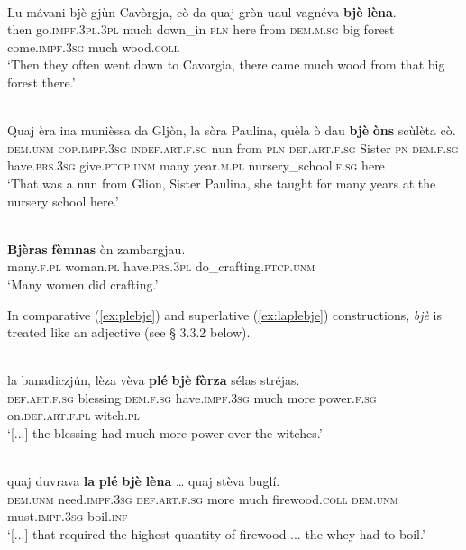 \ea

\\
\gll  Lu mávani bjè gjùn Cavòrgja, cò da quaj gròn uaul vagnéva \textbf{bjè} \textbf{lèna}.\\
then go.\textsc{impf.3pl.3pl} much down\_in \textsc{pln} here from \textsc{dem.m.sg} big forest come.\textsc{impf.3sg} much wood.\textsc{coll}  \\
\glt `Then they often went down to Cavorgia, there came much wood from that big forest there.'
\z

\ea

\\
\gll Quaj èra ina munièssa da Gljòn, la sòra Paulina, quèla ò dau \textbf{bjè} \textbf{òns} scùlèta cò.\\
\textsc{dem.unm} \textsc{cop.impf.3sg} \textsc{indef.art.f.sg} nun from \textsc{pln} \textsc{def.art.f.sg} Sister \textsc{pn} \textsc{dem.f.sg}  have.\textsc{prs.3sg} give.\textsc{ptcp.unm} many year.\textsc{m.pl} nursery\_school.\textsc{f.sg} here\\
\glt `That was a nun from Glion, Sister Paulina, she taught for many years at the nursery school here.'
\z

\ea

\\
\gll \textbf{Bjèras} \textbf{fèmnas} òn zambargjau.\\
many.\textsc{f.pl} woman.\textsc{pl} have.\textsc{prs.3pl} do\_crafting.\textsc{ptcp.unm}\\
\glt `Many women did crafting.'
\z

In comparative (\ref{ex:plebje}) and superlative (\ref{ex:laplebje}) constructions, \textit{bjè} is treated like an adjective (see § 3.3.2 below). 

\ea
\label{ex:plebje}
\\
	\gll [...] la banadiczjún, lèza vèva \textbf{plé} \textbf{bjè} \textbf{fòrza} sélas stréjas.\\
{} \textsc{def.art.f.sg} blessing \textsc{dem.f.sg} have.\textsc{impf.3sg} much more power.\textsc{f.sg} on.\textsc{def.art.f.pl} witch.\textsc{pl}\\
\glt `[...] the blessing had much more power over the witches.'
\z

\ea
\label{ex:laplebje}
\\
\gll [...] quaj duvrava \textbf{la} \textbf{plé} \textbf{bjè} \textbf{lèna} … quaj stèva buglí.  \\
{} \textsc{dem.unm} need.\textsc{impf.3sg} \textsc{def.art.f.sg} more much firewood.\textsc{coll} {} \textsc{dem.unm} must.\textsc{impf.3sg} boil.\textsc{inf}\\
\glt `[...] that required the highest quantity of firewood ... the whey had to boil.'
\z

